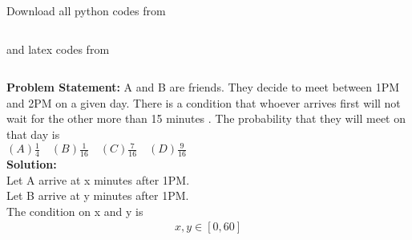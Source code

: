 \documentclass[journal,12pt,twocolumn]{IEEEtran}
\begin{document}
\maketitle
\newpage
\bigskip
\renewcommand{\thefigure}{\theenumi}
\renewcommand{\thetable}{\theenumi}
Download all python codes from 
\begin{lstlisting}

\end{lstlisting}
%
and latex codes from 
%
\begin{lstlisting}

\end{lstlisting}
\textbf{Problem Statement:} A and B are friends. They decide to meet between 1PM and 2PM on a given day. There is a condition that whoever arrives first will not wait for the other more than 15 minutes . The probability that they will meet on that day is \newline
\\
$(A)\frac{1}{4} \quad (B)\frac{1}{16} \quad (C)\frac{7}{16} \quad (D)\frac{9}{16}$ 
\\
\textbf{Solution:}
\\
Let A arrive at x minutes after 1PM.
\\
Let B arrive at y minutes after 1PM.
\\
The condition on x and y is 
\begin{align}
    x,y \in [0,60]
    \label{eq:eq1}
\end{align}
\end{document}
